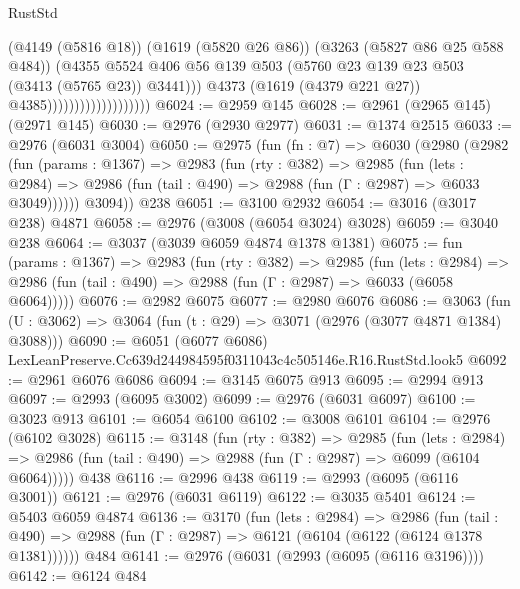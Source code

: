 \begin{lexlean}{RustStd}
\begin{coremodule}
                                            (@4149 (@5816 @18))
                                            (@1619 (@5820 @26 @86))
                                            (@3263 (@5827 @86 @25 @588 @484))
                                            (@4355
                                              @5524
                                              @406
                                              @56
                                              @139
                                              @503
                                              (@5760 @23 @139 @23 @503 (@3413 (@5765 @23)) @3441)))
                                          @4373
                                          (@1619 (@4379 @221 @27))
                                          @4385)))))))))))))))))))
@6024 := @2959 @145
@6028 := @2961 (@2965 @145) (@2971 @145)
@6030 := @2976 (@2930 @2977)
@6031 := @1374 @2515
@6033 := @2976 (@6031 @3004)
@6050 := @2975
    (fun (fn : @7) =>
    @6030
      (@2980
        (@2982
          (fun (params : @1367) =>
          @2983
            (fun (rty : @382) =>
            @2985
              (fun (lets : @2984) =>
              @2986 (fun (tail : @490) => @2988 (fun (Γ : @2987) => @6033 @3049))))))
        @3094))
    @238
@6051 := @3100 @2932
@6054 := @3016 (@3017 @238) @4871
@6058 := @2976 (@3008 (@6054 @3024) @3028)
@6059 := @3040 @238
@6064 := @3037 (@3039 @6059 @4874 @1378 @1381)
@6075 := fun (params : @1367) =>
  @2983
    (fun (rty : @382) =>
    @2985
      (fun (lets : @2984) =>
      @2986 (fun (tail : @490) => @2988 (fun (Γ : @2987) => @6033 (@6058 @6064)))))
@6076 := @2982 @6075
@6077 := @2980 @6076
@6086 := @3063 (fun (U : @3062) => @3064 (fun (t : @29) => @3071 (@2976 (@3077 @4871 @1384) @3088)))
@6090 := @6051 (@6077 @6086) LexLeanPreserve.Cc639d244984595f0311043c4c505146e.R16.RustStd.look5
@6092 := @2961 @6076 @6086
@6094 := @3145 @6075 @913
@6095 := @2994 @913
@6097 := @2993 (@6095 @3002)
@6099 := @2976 (@6031 @6097)
@6100 := @3023 @913
@6101 := @6054 @6100
@6102 := @3008 @6101
@6104 := @2976 (@6102 @3028)
@6115 := @3148
    (fun (rty : @382) =>
    @2985
      (fun (lets : @2984) =>
      @2986 (fun (tail : @490) => @2988 (fun (Γ : @2987) => @6099 (@6104 @6064)))))
    @438
@6116 := @2996 @438
@6119 := @2993 (@6095 (@6116 @3001))
@6121 := @2976 (@6031 @6119)
@6122 := @3035 @5401
@6124 := @5403 @6059 @4874
@6136 := @3170
    (fun (lets : @2984) =>
    @2986
      (fun (tail : @490) => @2988 (fun (Γ : @2987) => @6121 (@6104 (@6122 (@6124 @1378 @1381))))))
    @484
@6141 := @2976 (@6031 (@2993 (@6095 (@6116 @3196))))
@6142 := @6124 @484

\end{coremodule}
\end{lexlean}
